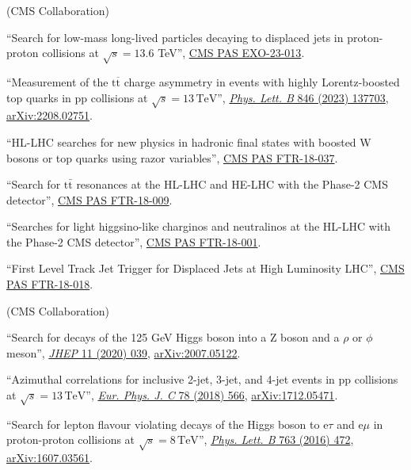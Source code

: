 \begin{description}[leftmargin=12pt,font=\normalfont\textit]
\begin{description}[leftmargin=12pt,font=\normalfont,labelsep=0em]
\end{description}
\item[CMS Certified Language Editor (CCLE):] (CMS Collaboration)
\begin{description}[leftmargin=12pt,font=\normalfont,labelsep=0em]
\item ``Search for low-mass long-lived particles decaying to displaced jets in proton-proton collisions at $\sqrt{s} = 13.6$ TeV'', \href{http://cds.cern.ch/record/2893044}{CMS PAS EXO-23-013}.
\item ``Measurement of the $\text{t}\overline{\text{t}}$ charge asymmetry in events with highly Lorentz-boosted top quarks in pp collisions at $\sqrt{s} = 13\,\text{TeV}$'', \href{https://doi.org/10.1016/j.physletb.2023.137703}{\emph{Phys. Lett. B} 846 (2023) 137703}, \href{https://arxiv.org/abs/2208.02751}{arXiv:2208.02751}.
\item ``HL-LHC searches for new physics in hadronic final states with boosted W bosons or top quarks using razor variables'', \href{https://cds.cern.ch/record/2658262}{CMS PAS FTR-18-037}.
\item ``Search for $\text{t}\bar{\text{t}}$ resonances at the HL-LHC and HE-LHC with the Phase-2 CMS detector'', \href{https://cds.cern.ch/record/2649032}{CMS PAS FTR-18-009}.
\item ``Searches for light higgsino-like charginos and neutralinos at the HL-LHC with the Phase-2 CMS detector'', \href{https://cds.cern.ch/record/2648538}{CMS PAS FTR-18-001}.
\item ``First Level Track Jet Trigger for Displaced Jets at High Luminosity LHC'', \href{https://cds.cern.ch/record/2647987}{CMS PAS FTR-18-018}.
\end{description}
\item[FNAL institutional review leader:] (CMS Collaboration)
\begin{description}[leftmargin=12pt,font=\normalfont,labelsep=0em]
\item ``Search for decays of the 125 GeV Higgs boson into a Z boson and a $\rho$ or $\phi$ meson'', \href{https://doi.org/10.1007/JHEP11(2020)039}{\emph{JHEP} 11 (2020) 039}, \href{https://arxiv.org/abs/2007.05122}{arXiv:2007.05122}.
\item ``Azimuthal correlations for inclusive 2-jet, 3-jet, and 4-jet events in pp collisions at $\sqrt{s} = 13\,\text{TeV}$'', \href{http://dx.doi.org/10.1140/epjc/s10052-018-6033-4}{\emph{Eur. Phys. J. C} 78 (2018) 566}, \href{http://arxiv.org/abs/1712.05471}{arXiv:1712.05471}.
\item ``Search for lepton flavour violating decays of the Higgs boson to e$\tau$ and e$\mu$ in proton-proton collisions at $\sqrt{s} = 8\,\text{TeV}$'', \href{http://dx.doi.org/10.1016/j.physletb.2016.09.062}{\emph{Phys. Lett. B} 763 (2016) 472}, \href{http://arxiv.org/abs/1607.03561}{arXiv:1607.03561}.
\end{description}
\end{description}